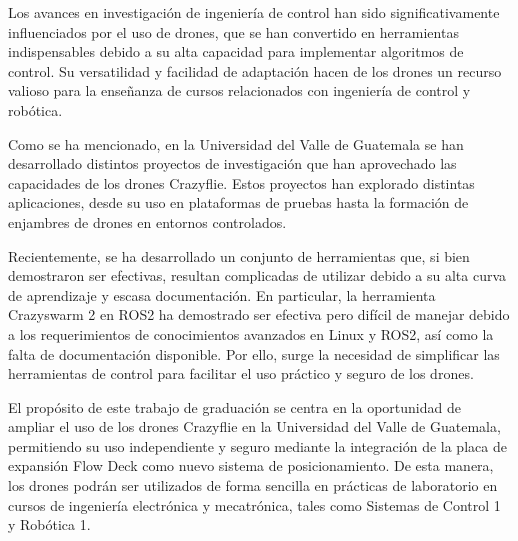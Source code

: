 Los avances en investigación de ingeniería de control han sido significativamente influenciados por el uso de drones, que se han convertido en herramientas indispensables debido a su alta capacidad para implementar algoritmos de control. Su versatilidad y facilidad de adaptación hacen de los drones un recurso valioso para la enseñanza de cursos relacionados con ingeniería de control y robótica. 

Como se ha mencionado, en la Universidad del Valle de Guatemala se han desarrollado distintos proyectos de investigación que han aprovechado las capacidades de los drones Crazyflie. Estos proyectos han explorado distintas aplicaciones, desde su uso en plataformas de pruebas hasta la formación de enjambres de drones en entornos controlados. 

Recientemente, se ha desarrollado un conjunto de herramientas que, si bien demostraron ser efectivas, resultan complicadas de utilizar debido a su alta curva de aprendizaje y escasa documentación. En particular, la herramienta Crazyswarm 2 en ROS2 ha demostrado ser efectiva pero difícil de manejar debido a los requerimientos de conocimientos avanzados en Linux y ROS2, así como la falta de documentación disponible. Por ello, surge la necesidad de simplificar las herramientas de control para facilitar el uso práctico y seguro de los drones.

El propósito de este trabajo de graduación se centra en la oportunidad de ampliar el uso de los drones Crazyflie en la Universidad del Valle de Guatemala, permitiendo su uso independiente y seguro mediante la integración de la placa de expansión Flow Deck como nuevo sistema de posicionamiento. De esta manera, los drones podrán ser utilizados de forma sencilla en prácticas de laboratorio en cursos de ingeniería electrónica y mecatrónica, tales como Sistemas de Control 1 y Robótica 1.
